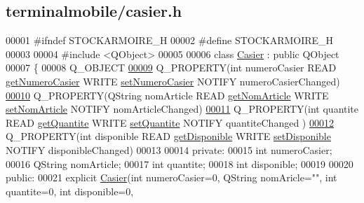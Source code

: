 \hypertarget{terminalmobile_2casier_8h_source}{}\subsection{terminalmobile/casier.h}
\label{terminalmobile_2casier_8h_source}

\begin{DoxyCode}
00001 \textcolor{preprocessor}{#ifndef STOCKARMOIRE\_H}
00002 \textcolor{preprocessor}{#define STOCKARMOIRE\_H}
00003 
00004 \textcolor{preprocessor}{#include <QObject>}
00005 
00006 \textcolor{keyword}{class }\hyperlink{class_casier}{Casier} : \textcolor{keyword}{public} QObject
00007 \{
00008     Q\_OBJECT
\hyperlink{class_casier_abc4e6c9bde55c9b703ea53d85b6b1219}{00009}     Q\_PROPERTY(\textcolor{keywordtype}{int} numeroCasier READ \hyperlink{class_casier_a77004d988048cf4c8ad521800745be73}{getNumeroCasier} WRITE 
      \hyperlink{class_casier_a5ae4ea249ab63e1ad44af87fb019a6b0}{setNumeroCasier} NOTIFY numeroCasierChanged)
\hyperlink{class_casier_a9632bfa0e94a522bab9da1c3834eaf5a}{00010}     Q\_PROPERTY(QString nomArticle READ \hyperlink{class_casier_ad1e4ebd48218bc19d8e29e98b6a9e939}{getNomArticle} WRITE 
      \hyperlink{class_casier_ab46ac6ac9c4fae70f9b8ef23f856fa52}{setNomArticle} NOTIFY nomArticleChanged)
\hyperlink{class_casier_acf950b0ab2ee437a9dbc8c6b66432b4c}{00011}     Q\_PROPERTY(\textcolor{keywordtype}{int} quantite READ \hyperlink{class_casier_ad4b3ee57fdc7240b2a895b7f70f4cd11}{getQuantite} WRITE \hyperlink{class_casier_a41aee5f476516dc87b66674c6b9c6d4b}{setQuantite} NOTIFY quantiteChanged
      )
\hyperlink{class_casier_a5bf1314910ade36747faffdd891d94e9}{00012}     Q\_PROPERTY(\textcolor{keywordtype}{int} disponible READ \hyperlink{class_casier_a7d25b1a4bdbe4e600734cda8fb944258}{getDisponible} WRITE 
      \hyperlink{class_casier_ac41e3c5e88e638c1375b35940c1870ed}{setDisponible} NOTIFY disponibleChanged)   
00013 
00014 private:
00015     \textcolor{keywordtype}{int} numeroCasier;
00016     QString nomArticle;
00017     \textcolor{keywordtype}{int} quantite;
00018     \textcolor{keywordtype}{int} disponible;
00019 
00020 public:
00021     explicit \hyperlink{class_casier}{Casier}(\textcolor{keywordtype}{int} numeroCasier=0, QString nomAricle="", \textcolor{keywordtype}{int} quantite=0, \textcolor{keywordtype}{int} disponible=0, 

\end{DoxyCode}
